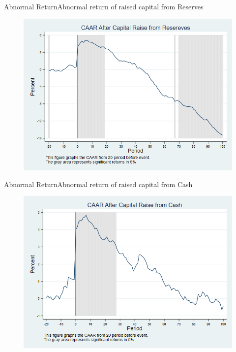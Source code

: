 \documentclass{beamer}
\begin{document}
\begin{frame}{Abnormal Return}{Abnormal return of raised capital from Reserves}
\label{abreturnsaving4Factor}
\begin{figure}
\centering
\includegraphics[width=0.65\linewidth]{AbReturnSaving_4Factor}
\label{fig:abreturnsaving2}
\end{figure}

\hfill\hyperlink{abreturnsaving}{}
\end{frame}


\begin{frame}{Abnormal Return}{Abnormal return of raised capital from Cash}
\label{abreturncash4Factor}
\begin{figure}
\centering
\includegraphics[width=0.65\linewidth]{AbReturnCash_4Factor}
\label{fig:abreturncash2}
\end{figure}
\hfill\hyperlink{abreturncash}{}
\end{frame}
\end{document}
